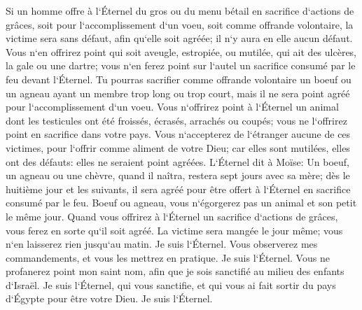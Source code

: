 \verse Si un homme offre à l`Éternel du gros ou du menu bétail en sacrifice d`actions de grâces, soit pour l`accomplissement d`un voeu, soit comme offrande volontaire, la victime sera sans défaut, afin qu`elle soit agréée; il n`y aura en elle aucun défaut. 
\verse Vous n`en offrirez point qui soit aveugle, estropiée, ou mutilée, qui ait des ulcères, la gale ou une dartre; vous n`en ferez point sur l`autel un sacrifice consumé par le feu devant l`Éternel. 
\verse Tu pourras sacrifier comme offrande volontaire un boeuf ou un agneau ayant un membre trop long ou trop court, mais il ne sera point agréé pour l`accomplissement d`un voeu. 
\verse Vous n`offrirez point à l`Éternel un animal dont les testicules ont été froissés, écrasés, arrachés ou coupés; vous ne l`offrirez point en sacrifice dans votre pays. 
\verse Vous n`accepterez de l`étranger aucune de ces victimes, pour l`offrir comme aliment de votre Dieu; car elles sont mutilées, elles ont des défauts: elles ne seraient point agréées. 
\verse L`Éternel dit à Moïse: 
\verse Un boeuf, un agneau ou une chèvre, quand il naîtra, restera sept jours avec sa mère; dès le huitième jour et les suivants, il sera agréé pour être offert à l`Éternel en sacrifice consumé par le feu. 
\verse Boeuf ou agneau, vous n`égorgerez pas un animal et son petit le même jour. 
\verse Quand vous offrirez à l`Éternel un sacrifice d`actions de grâces, vous ferez en sorte qu`il soit agréé. 
\verse La victime sera mangée le jour même; vous n`en laisserez rien jusqu`au matin. Je suis l`Éternel. 
\verse Vous observerez mes commandements, et vous les mettrez en pratique. Je suis l`Éternel. 
\verse Vous ne profanerez point mon saint nom, afin que je sois sanctifié au milieu des enfants d`Israël. Je suis l`Éternel, qui vous sanctifie, 
\verse et qui vous ai fait sortir du pays d`Égypte pour être votre Dieu. Je suis l`Éternel. 

